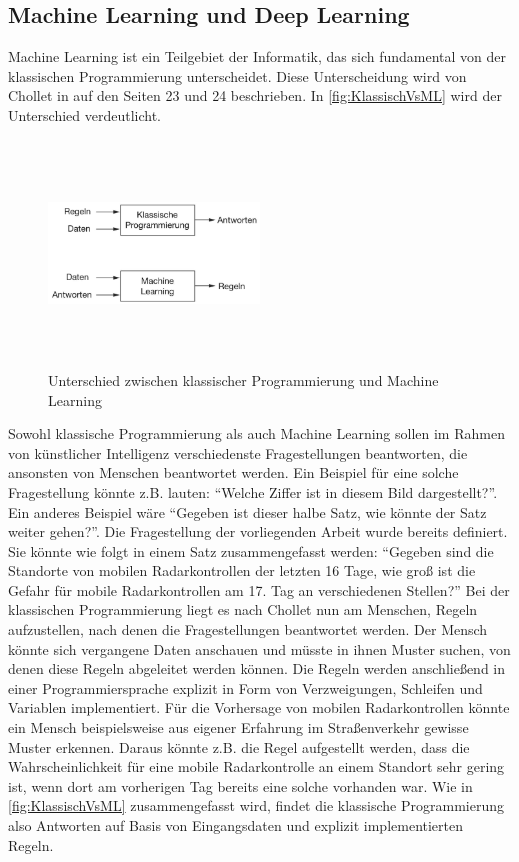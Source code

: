 \subsection{Machine Learning und Deep Learning}
\label{sec:MachineDeepLearning}

Machine Learning ist ein Teilgebiet der Informatik, das sich fundamental von der klassischen Programmierung unterscheidet.
Diese Unterscheidung wird von Chollet in \cite{DeepLearningPythonKeras} auf den Seiten 23 und 24 beschrieben.
In \autoref{fig:KlassischVsML} wird der Unterschied verdeutlicht.

\begin{figure}[h]
    \centering
    \includegraphics[width=0.5\textwidth,height=6cm,keepaspectratio=true]{content/images/KlassischVsML.png}
    \caption{Unterschied zwischen klassischer Programmierung und Machine Learning \cite[Abb.~1.2]{DeepLearningPythonKeras}}
    \label{fig:KlassischVsML}
\end{figure}

Sowohl klassische Programmierung als auch Machine Learning sollen im Rahmen von künstlicher Intelligenz verschiedenste Fragestellungen beantworten, die ansonsten von Menschen beantwortet werden.
Ein Beispiel für eine solche Fragestellung könnte z.B. lauten: "`Welche Ziffer ist in diesem Bild dargestellt?"'.
Ein anderes Beispiel wäre "`Gegeben ist dieser halbe Satz, wie könnte der Satz weiter gehen?"'.
Die Fragestellung der vorliegenden Arbeit wurde bereits definiert.
Sie könnte wie folgt in einem Satz zusammengefasst werden:
"`Gegeben sind die Standorte von mobilen Radarkontrollen der letzten 16 Tage, wie groß ist die Gefahr für mobile Radarkontrollen am 17. Tag an verschiedenen Stellen?"'
Bei der klassischen Programmierung liegt es nach Chollet nun am Menschen, Regeln aufzustellen, nach denen die Fragestellungen beantwortet werden.
Der Mensch könnte sich vergangene Daten anschauen und müsste in ihnen Muster suchen, von denen diese Regeln abgeleitet werden können.
Die Regeln werden anschließend in einer Programmiersprache explizit in Form von Verzweigungen, Schleifen und Variablen implementiert.
Für die Vorhersage von mobilen Radarkontrollen könnte ein Mensch beispielsweise aus eigener Erfahrung im Straßenverkehr gewisse Muster erkennen.
Daraus könnte z.B. die Regel aufgestellt werden, dass die Wahrscheinlichkeit für eine mobile Radarkontrolle an einem Standort sehr gering ist, wenn dort am vorherigen Tag bereits eine solche vorhanden war.
Wie in \autoref{fig:KlassischVsML} zusammengefasst wird, findet die klassische Programmierung also Antworten auf Basis von Eingangsdaten und explizit implementierten Regeln.

